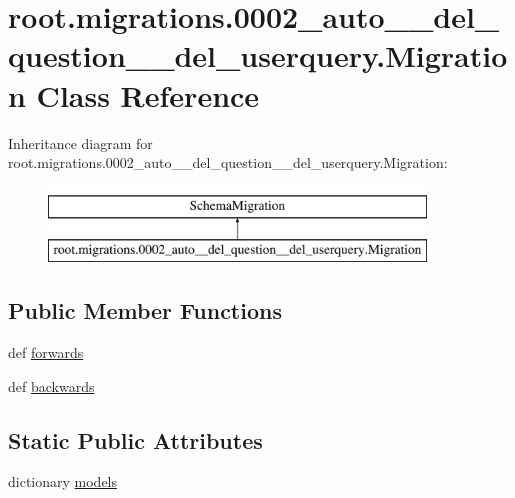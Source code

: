 \hypertarget{classroot_1_1migrations_1_10002__auto____del__question____del__userquery_1_1_migration}{\section{root.\-migrations.0002\-\_\-auto\-\_\-\-\_\-del\-\_\-question\-\_\-\-\_\-del\-\_\-userquery.Migration Class Reference}
\label{classroot_1_1migrations_1_10002__auto____del__question____del__userquery_1_1_migration}
}
Inheritance diagram for root.\-migrations.0002\-\_\-auto\-\_\-\-\_\-del\-\_\-question\-\_\-\-\_\-del\-\_\-userquery.Migration\-:\begin{figure}[H]
\begin{center}
\leavevmode
\includegraphics[height=2.000000cm]{classroot_1_1migrations_1_10002__auto____del__question____del__userquery_1_1_migration}
\end{center}
\end{figure}
\subsection*{Public Member Functions}
\begin{DoxyCompactItemize}
\item 
def \hyperlink{classroot_1_1migrations_1_10002__auto____del__question____del__userquery_1_1_migration_aa88abc25b41d7537e77ec1b966ef77df}{forwards}
\item 
def \hyperlink{classroot_1_1migrations_1_10002__auto____del__question____del__userquery_1_1_migration_ac32ba4f3117a8fd1d67c5c867b69f46b}{backwards}
\end{DoxyCompactItemize}
\subsection*{Static Public Attributes}
\begin{DoxyCompactItemize}
\item 
dictionary \hyperlink{classroot_1_1migrations_1_10002__auto____del__question____del__userquery_1_1_migration_a76a9bf8a7b9e7f4ccc5345d06fc13ec3}{models}
\end{DoxyCompactItemize}


